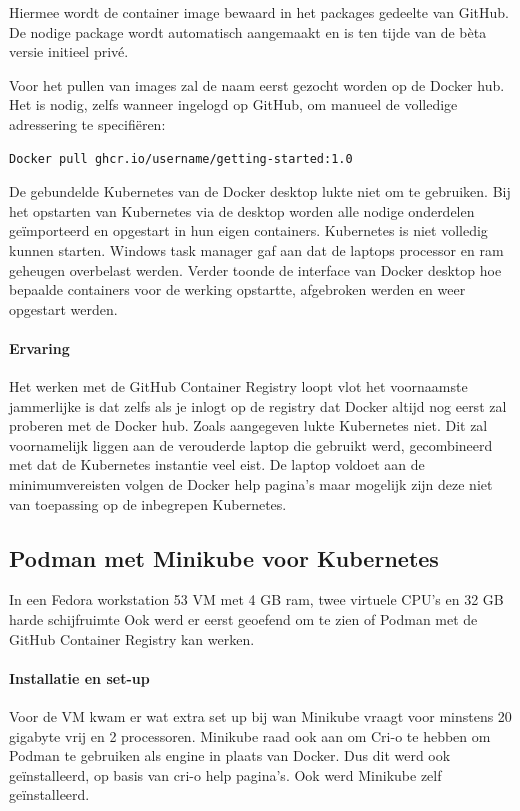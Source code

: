 Hiermee wordt de container image bewaard in het packages gedeelte van GitHub. De nodige package wordt automatisch aangemaakt en is ten tijde van de bèta versie initieel privé.

Voor het pullen van images zal de naam eerst gezocht worden op de Docker hub. Het is nodig, zelfs wanneer ingelogd op GitHub, om manueel de volledige adressering te specifiëren:
\begin{verbatim}
Docker pull ghcr.io/username/getting-started:1.0
\end{verbatim}


De gebundelde Kubernetes van de Docker desktop lukte niet om te gebruiken. Bij het opstarten van Kubernetes via de desktop worden alle nodige onderdelen geïmporteerd en opgestart in hun eigen containers. Kubernetes is niet volledig kunnen starten. Windows task manager gaf aan dat de laptops processor en ram geheugen overbelast werden. Verder toonde de interface van Docker desktop hoe bepaalde containers voor de werking opstartte, afgebroken werden en weer opgestart werden.

\paragraph{Ervaring}
Het werken met de GitHub Container Registry loopt vlot het voornaamste jammerlijke is dat zelfs als je inlogt op de registry dat Docker altijd nog eerst zal proberen met de Docker hub.
Zoals aangegeven lukte Kubernetes niet. Dit zal voornamelijk liggen aan de verouderde laptop die gebruikt werd, gecombineerd met dat de Kubernetes instantie veel eist. De laptop voldoet aan de minimumvereisten volgen de Docker help pagina’s maar mogelijk zijn deze niet van toepassing op de inbegrepen Kubernetes.  


\subsection{Podman met Minikube voor Kubernetes}
In een Fedora workstation 53 VM met 4 GB ram, twee virtuele CPU’s en 32 GB harde schijfruimte Ook werd er eerst geoefend om te zien of Podman met de GitHub Container Registry kan werken.
\paragraph{Installatie en set-up}
Voor de VM kwam er wat extra set up bij wan Minikube vraagt voor minstens 20 gigabyte vrij en 2 processoren.
Minikube raad ook aan om Cri-o te hebben om Podman te gebruiken als engine in plaats van Docker. Dus dit werd ook geïnstalleerd, op basis van cri-o help pagina’s.  Ook werd Minikube zelf geïnstalleerd.

